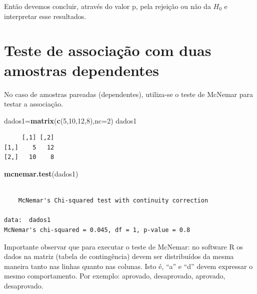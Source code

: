 \documentclass[12pt,brazil,oneside]{book}
\newenvironment{Shaded}{\begin{snugshade}}{\end{snugshade}}
\newcommand{\DataTypeTok}[1]{\textcolor[rgb]{0.13,0.29,0.53}{#1}}
\newcommand{\DecValTok}[1]{\textcolor[rgb]{0.00,0.00,0.81}{#1}}
\newcommand{\KeywordTok}[1]{\textcolor[rgb]{0.13,0.29,0.53}{\textbf{#1}}}
\newcommand{\NormalTok}[1]{#1}
\begin{document}
Então devemos concluir, através do valor p, pela rejeição ou não da \(H_0\) e interpretar esse resultados.

\hypertarget{teste-de-associacao-com-duas-amostras-dependentes}{%
\section{Teste de associação com duas amostras dependentes}\label{teste-de-associacao-com-duas-amostras-dependentes}}

No caso de amostras pareadas (dependentes), utiliza-se o teste de McNemar para testar a associação.

\begin{Shaded}
\begin{Highlighting}[]
\NormalTok{dados1=}\KeywordTok{matrix}\NormalTok{(}\KeywordTok{c}\NormalTok{(}\DecValTok{5}\NormalTok{,}\DecValTok{10}\NormalTok{,}\DecValTok{12}\NormalTok{,}\DecValTok{8}\NormalTok{),}\DataTypeTok{nc=}\DecValTok{2}\NormalTok{)}
\NormalTok{dados1}
\end{Highlighting}
\end{Shaded}

\begin{verbatim}
     [,1] [,2]
[1,]    5   12
[2,]   10    8
\end{verbatim}

\begin{Shaded}
\begin{Highlighting}[]
\KeywordTok{mcnemar.test}\NormalTok{(dados1)}
\end{Highlighting}
\end{Shaded}

\begin{verbatim}

    McNemar's Chi-squared test with continuity correction

data:  dados1
McNemar's chi-squared = 0.045, df = 1, p-value = 0.8
\end{verbatim}

Importante observar que para executar o teste de McNemar: no software R os dados na matriz (tabela de contingência) devem ser distribuídos da mesma maneira tanto nas linhas quanto nas colunas. Isto é, ``a'' e ``d'' devem expressar o mesmo comportamento. Por exemplo: aprovado, desaprovado, aprovado, desaprovado.
\end{document}
